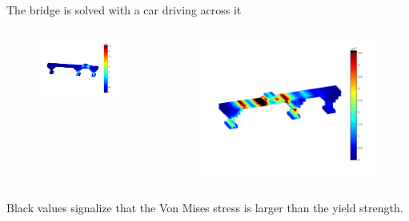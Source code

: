 \documentclass[screen]{beamer}
\begin{document}
\begin{frame}
The bridge is solved with a car driving across it
\begin{columns}   
    \begin{column}{.5\linewidth}
        \begin{figure}
  		\includegraphics[width=\textwidth]{figures/time080}
  		\end{figure}
    \end{column}   
    \begin{column}{.5\linewidth}
        \begin{figure}
  		\includegraphics[width=\textwidth]{figures/time230}
  		\end{figure}
    \end{column}
  \end{columns}
Black values signalize that the Von Mises stress is larger than the yield strength.
\end{frame}
\end{document}
